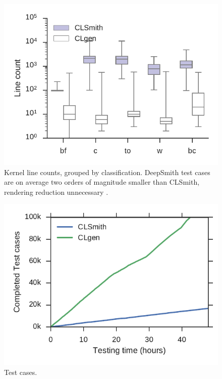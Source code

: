 \begin{figure}
	\centering %
	\includegraphics[width=\columnwidth]{build/img/kernel-sizes}%
	\caption{%
		Kernel line counts, grouped by classification. DeepSmith test cases are on average two orders of magnitude smaller than CLSmith, rendering reduction unnecessary .%
	}%
	\label{fig:kernel-sizes} %
\end{figure}


\begin{figure}
	\centering %
	\includegraphics[width=\columnwidth]{build/img/total-tests}%
	\caption{%
		Test cases. %
	}%
	\label{fig:total-tests} %
\end{figure}